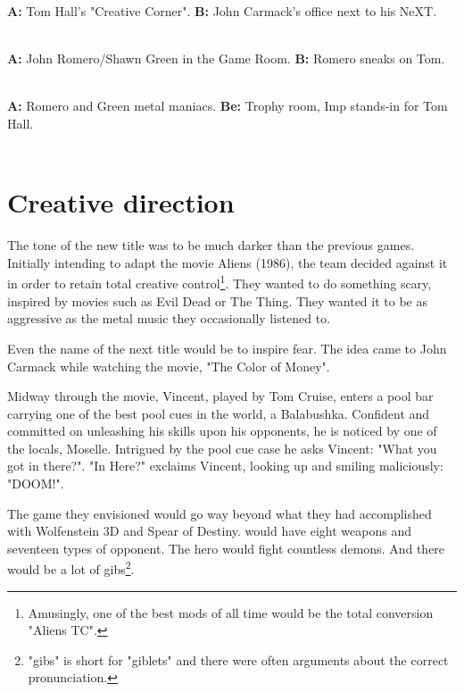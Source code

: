 \textbf{A:} Tom Hall's "Creative Corner". \textbf{B:} John Carmack's office next to his NeXT.\\
\\

\textbf{A:} John Romero/Shawn Green in the Game Room. \textbf{B:} Romero sneaks on Tom.\\
\\


\textbf{A:} Romero and Green metal maniacs. \textbf{Be:} Trophy room, Imp stands-in for Tom Hall.\\
\\


\section{Creative direction}
The tone of the new title was to be much darker than the previous games. Initially intending to adapt the movie Aliens (1986), the team decided against it in order to retain total creative control\footnote{Amusingly, one of the best mods of all time would be the total conversion "Aliens TC".}. They wanted to do something scary, inspired by movies such as Evil Dead or The Thing. They wanted it to be as aggressive as the metal music they occasionally listened to.\\
\par
Even the name of the next title would be to inspire fear. The idea came to John Carmack while watching the movie, "The Color of Money".\\ 
\par
Midway through the movie, Vincent, played by Tom Cruise, enters a pool bar carrying one of the best pool cues in the world, a Balabushka. Confident and committed on unleashing his skills upon his opponents, he is noticed by one of the locals, Moselle. Intrigued by the pool cue case he asks Vincent: "What you got in there?". "In Here?" exclaims Vincent, looking up and smiling maliciously: "DOOM!".\\
\par

\par
\par
{
\setlength{\abovecaptionskip}{11pt}
}
\par
\vspace{-15pt}
The game they envisioned would go way beyond what they had accomplished with Wolfenstein 3D and Spear of Destiny. \doom{} would have eight weapons and seventeen types of opponent. The hero would fight countless demons. And there would be a lot of gibs\footnote{"gibs" is short for "giblets" and there were often arguments about the correct pronunciation.}.


